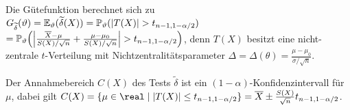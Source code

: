 \begin{Bsp}
    Die Gütefunktion berechnet sich zu
    $G_{\widetilde{\delta}}(\vartheta)
    = \mathbb{E}_\vartheta(\widetilde{\delta}(X))
    = \mathbb{P}_\vartheta(|T(X)| > t_{n-1,1-\alpha/2})$\\
    $= \mathbb{P}_\vartheta\!\left(\left|\frac{\overline{X} - \mu}{S(X)/\sqrt{n}} +
    \frac{\mu - \mu_0}{S(X)/\sqrt{n}}\right| > t_{n-1,1-\alpha/2}\right)$,
    denn $T(X)$ besitzt eine nicht-zentrale $t$-Verteilung mit Nichtzentralitätsparameter
    $\Delta = \Delta(\theta) = \frac{\mu - \mu_0}{\sigma/\sqrt{n}}$.
    
    Der Annahmebereich $C(X)$ des Tests $\widetilde{\delta}$ ist ein
    $(1-\alpha)$-Konfidenzintervall für $\mu$,
    dabei gilt $C(X) = \{\mu \in \real \;|\; |T(X)| \le t_{n-1,1-\alpha/2}\}
    = \overline{X} \pm \frac{S(X)}{\sqrt{n}} t_{n-1,1-\alpha/2}$.
\end{Bsp}

\pagebreak
